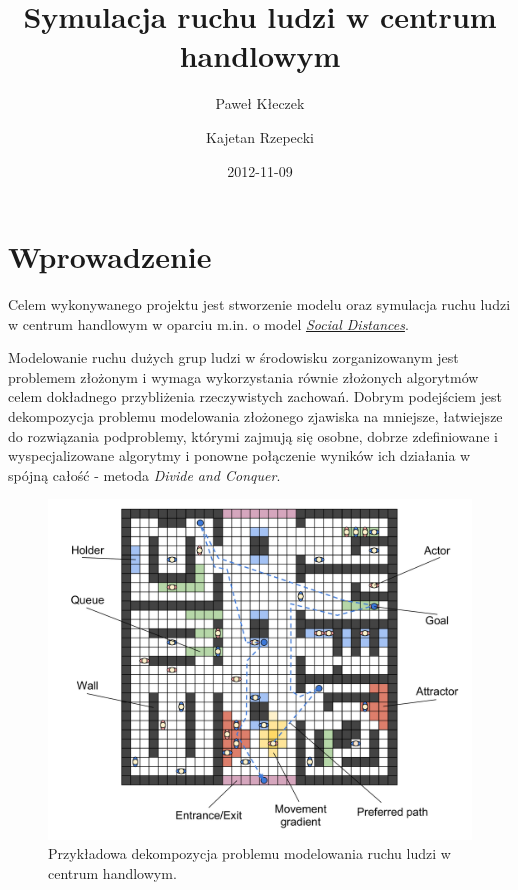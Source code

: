 \documentclass[a4paper, 12pt]{article}
\title{\textbf{Symulacja ruchu ludzi w centrum handlowym}}
\author{Paweł Kłeczek \and Kajetan Rzepecki}
\date{2012-11-09}
\begin{document}
    \vspace{\fill}
    \maketitle
    \vspace{\fill}
    \thispagestyle{empty}

\newpage
    \setcounter{page}{1}
    \setcounter{tocdepth}{3}
    \tableofcontents

\newpage
    \section{Wprowadzenie}
    \label{sec:intro}

\noindent
Celem wykonywanego projektu jest stworzenie modelu oraz symulacja ruchu ludzi w centrum handlowym w oparciu m.in. o model \hyperref[refs:social-distances-1]{\textit{Social Distances}}.

Modelowanie ruchu dużych grup ludzi w środowisku zorganizowanym jest problemem złożonym i wymaga wykorzystania równie złożonych algorytmów celem dokładnego przybliżenia rzeczywistych zachowań. Dobrym podejściem jest dekompozycja problemu modelowania złożonego zjawiska na mniejsze, łatwiejsze do rozwiązania podproblemy, którymi zajmują się osobne, dobrze zdefiniowane i wyspecjalizowane algorytmy i ponowne połączenie wyników ich działania w spójną całość - metoda \textit{Divide and Conquer}.

    \begin{figure}[h!]
        \centering
        \includegraphics[scale=0.3]{./img/Overview.pdf}
        \caption{Przykładowa dekompozycja problemu modelowania ruchu ludzi w centrum handlowym.}
        \label{fig:decomp}
    \end{figure}
\end{document}
